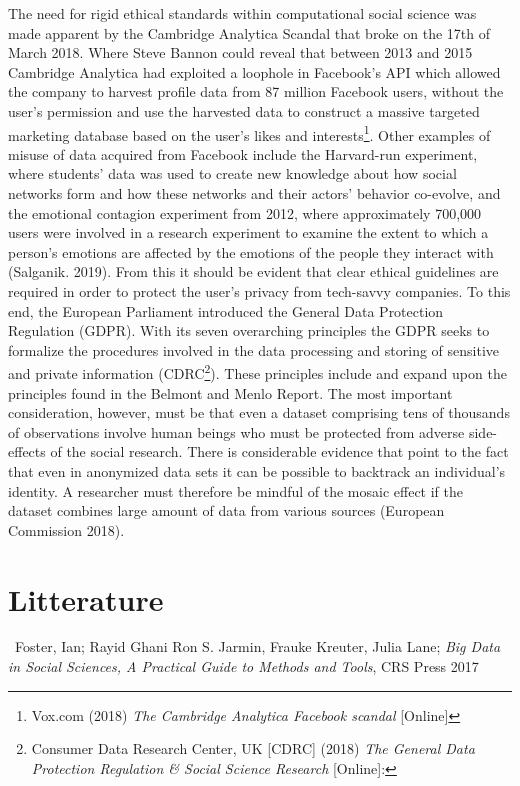 \documentclass[12pt,a4paper]{article}
\begin{document}
The need for rigid ethical standards within computational social science was made apparent by the Cambridge Analytica Scandal that broke on the 17th of March 2018. Where Steve Bannon could reveal that between 2013 and 2015 Cambridge Analytica had exploited a loophole in Facebook’s API which allowed the company to harvest profile data from 87 million Facebook users, without the user’s permission and use the harvested data to construct a massive targeted marketing database based on the user’s likes and interests\footnote{Vox.com (2018) \textit{The Cambridge Analytica Facebook scandal} [Online]}. Other examples of misuse of data acquired from Facebook include the Harvard-run experiment, where students' data was used to create new knowledge about how social networks form and how these networks and their actors' behavior co-evolve, and the emotional contagion experiment from 2012, where approximately 700,000 users were involved in a research experiment to examine the extent to which a person's emotions are affected by the emotions of the people they interact with (Salganik. 2019).\newline
From this it should be evident that clear ethical guidelines are required in order to protect the user's privacy from tech-savvy companies. To this end, the European Parliament introduced the General Data Protection Regulation (GDPR). With its seven overarching principles the GDPR seeks to formalize the procedures involved in the data processing and storing of sensitive and private information (CDRC\footnote{Consumer Data Research Center, UK  [CDRC] (2018) \textit{The General Data Protection Regulation \& Social Science Research} [Online]:}). These principles include and expand upon the principles found in the Belmont and Menlo Report. The most important consideration, however, must be that even a dataset comprising tens of thousands of observations involve human beings who must be protected from adverse side-effects of the social research. There is considerable evidence that point to the fact that even in anonymized data sets it can be possible to backtrack an individual's identity. A researcher must therefore be mindful of the mosaic effect if the dataset combines large amount of data from various sources (European Commission 2018).

\newpage
\section{Litterature}


\ Foster, Ian; Rayid Ghani Ron S. Jarmin, Frauke Kreuter, Julia Lane; \textit{Big Data in Social Sciences, A Practical Guide to Methods and Tools}, CRS Press 2017
\end{document}
